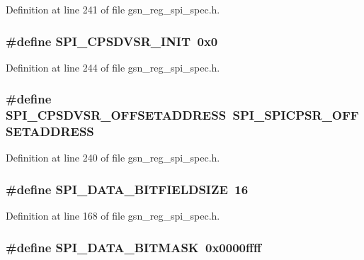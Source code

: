 Definition at line 241 of file gsn\_\-reg\_\-spi\_\-spec.h.

\hypertarget{a00573_a5c69fce252f4cd1ca2f495ab824c588d}{
\subsubsection[{SPI\_\-CPSDVSR\_\-INIT}]{\setlength{\rightskip}{0pt plus 5cm}\#define SPI\_\-CPSDVSR\_\-INIT~0x0}}
\label{a00573_a5c69fce252f4cd1ca2f495ab824c588d}


Definition at line 244 of file gsn\_\-reg\_\-spi\_\-spec.h.

\hypertarget{a00573_a74b9586113b5b2d1ede3df72d84a071d}{
\subsubsection[{SPI\_\-CPSDVSR\_\-OFFSETADDRESS}]{\setlength{\rightskip}{0pt plus 5cm}\#define SPI\_\-CPSDVSR\_\-OFFSETADDRESS~SPI\_\-SPICPSR\_\-OFFSETADDRESS}}
\label{a00573_a74b9586113b5b2d1ede3df72d84a071d}


Definition at line 240 of file gsn\_\-reg\_\-spi\_\-spec.h.

\hypertarget{a00573_afec459e47f23462c97a5b8a12db3c909}{
\subsubsection[{SPI\_\-DATA\_\-BITFIELDSIZE}]{\setlength{\rightskip}{0pt plus 5cm}\#define SPI\_\-DATA\_\-BITFIELDSIZE~16}}
\label{a00573_afec459e47f23462c97a5b8a12db3c909}


Definition at line 168 of file gsn\_\-reg\_\-spi\_\-spec.h.

\hypertarget{a00573_a7c9f8cfc1783904928f0f8b6254152c0}{
\subsubsection[{SPI\_\-DATA\_\-BITMASK}]{\setlength{\rightskip}{0pt plus 5cm}\#define SPI\_\-DATA\_\-BITMASK~0x0000ffff}}
\label{a00573_a7c9f8cfc1783904928f0f8b6254152c0}



